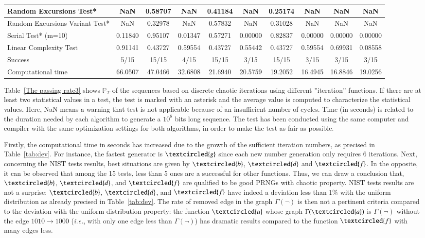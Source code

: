 \begin{table}
\begin{tabular}{|l||c|c|c|c|c|c|c|c|c|}
Random Excursions Test*				&NaN &  0.58707 &NaN &  0.41184 &NaN &  0.25174 &NaN &NaN &NaN \\ \hline
Random Excursions Variant Test*			&NaN &  0.32978 &NaN &  0.57832 &NaN &  0.31028 &NaN &NaN &NaN \\ \hline
Serial Test* (m=10)				&0.11840 &  0.95107 &  0.01347 &  0.57271 &  0.00000 &  0.82837 &  0.00000 &  0.00000 &    0.00000 \\ \hline
Linear Complexity Test				& 0.91141 &  0.43727 &  0.59554 &  0.43727 &  0.55442 &  0.43727 &  0.59554 &  0.69931 &    0.08558 \\ \hline
Success 					&5/15&15/15&4/15&15/15&3/15&15/15&3/15&3/15&3/15  \\ \hline
Computational time				&66.0507&47.0466&32.6808&21.6940&20.5759&19.2052&16.4945&16.8846&19.0256\\ \hline
  \end{tabular}
\end{table}


Table~\ref{The  passing rate3} shows $\mathbb{P}_T$  of the  sequences  based on
discrete chaotic  iterations using  different ''iteration'' functions.  If there
are  at least  two statistical  values in  a test,  the test  is marked  with an
asterisk  and the  average value  is  computed to  characterize the  statistical
values. Here,  NaN means  a warning that  test is  not applicable because  of an
insufficient  number of cycles.  Time (in  seconds) is  related to  the duration
needed by each  algorithm to generate a $10^8$ bits long  sequence. The test has
been conducted using  the same computer and compiler  with the same optimization
settings for both algorithms, in order to make the test as fair as possible.

Firstly, the computational  time in  seconds has increased due to the
growth of the sufficient iteration numbers, as precised  in Table~\ref{tab:dev}.
For  instance, the fastest generator is $\textcircled{g}$ since each new 
number generation only requires 6 iterations.
Next, concerning the  NIST tests results, 
best situations are given by $\textcircled{b}$,  $\textcircled{d}$ and
$\textcircled{f}$. In the opposite, it can be observed that among the 15 tests,
less than 5 ones are a successful for  other functions. 
Thus,  we can draw a  conclusion that, $\textcircled{b}$, $\textcircled{d}$,
and $\textcircled{f}$ are qualified to be good PRNGs with chaotic property.
NIST tests results are not a surprise:
$\textcircled{b}$,  $\textcircled{d}$, and $\textcircled{f}$ have indeed a deviation less than 1\% with 
the uniform distribution as already precised in Table~\ref{tab:dev}.
The rate of removed edge in the graph $\Gamma(\neg)$ is then not a pertinent
criteria compared to the deviation with the uniform distribution property:
the function $\textcircled{a}$ whose graph $\Gamma(\textcircled{a})$ is $\Gamma(\neg)$ without the
edge $1010 \rightarrow 1000$ (\textit{i.e.}, with only one edge less than
$\Gamma(\neg)$) has dramatic results compared to the function 
$\textcircled{f}$ with many edges less.

